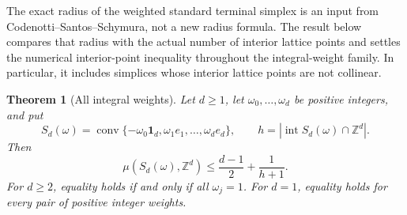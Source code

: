 \documentclass[11pt,a4paper]{article}
\newtheorem{theorem}{Theorem}[section]
\theoremstyle{remark}\newtheorem{remark}[theorem]{Remark}
\begin{document}
The exact radius of the weighted standard terminal simplex is an input
from Codenotti--Santos--Schymura, not a new radius formula.  The result
below compares that radius with the actual number of interior lattice
points and settles the numerical interior-point inequality throughout
the integral-weight family.  In particular, it includes simplices whose
interior lattice points are not collinear.

\begin{theorem}[All integral weights]
\label{r4d:weighted-D}
Let $d\ge1$, let $\omega_0,\ldots,\omega_d$ be positive integers, and put
\[
 S_d(\omega)=\operatorname{conv}
 \{-\omega_0\mathbf1_d,\omega_1e_1,\ldots,\omega_de_d\},
 \qquad h=|\operatorname{int}S_d(\omega)\cap\mathbb Z^d|.
\]
Then
\[
 \mu(S_d(\omega),\mathbb Z^d)
 \le \frac{d-1}{2}+\frac1{h+1}.
\]
For $d\ge2$, equality holds if and only if all $\omega_j=1$.
For $d=1$, equality holds for every pair of positive integer weights.
\end{theorem}
\end{document}
